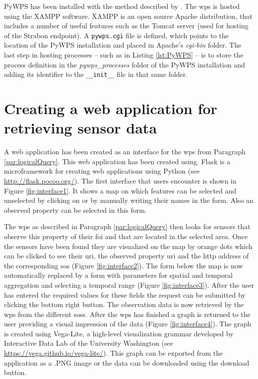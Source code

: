 PyWPS has been installed with the method described by \cite{wps:Deltares}. The \ac{wps} is hosted using the XAMPP software. XAMPP is an open source Apache distribution, that includes a number of useful features such as the Tomcat server (used for hosting of the Strabon endpoint). A \texttt{pywps.cgi} file is defined, which points to the location of the PyWPS installation and placed in Apache's \textit{cgi-bin} folder. The last step in hosting processes -- such as in Listing \ref{lst:PyWPS} -- is to store the process definition in the \textit{pywps\_processes} folder of the PyWPS installation and adding its identifier to the \texttt{\_\_init\_\_} file in that same folder.    

\section{Creating a web application for retrieving sensor data}
\label{par:webApp}
A web application has been created as an interface for the \ac{wps} from Paragraph \ref{par:logicalQuery}. This web application has been created using. Flask is a microframework for creating web applications using Python (see \url{http://flask.pocoo.org/}). The first interface that users encounter is shown in Figure \ref{fig:interface1}. It shows a map on which features can be selected and unselected by clicking on or by manually writing their names in the form. Also an observed property can be selected in this form.

The \ac{wps} as described in Paragraph \ref{par:logicalQuery} then looks for sensors that observe this property of their \ac{foi} and that are located in the selected area. Once the sensors have been found they are visualized on the map by orange dots which can be clicked to see their \ac{uri}, the observed property \ac{uri} and the \ac{http} address of the corresponding \ac{sos} (Figure \ref{fig:interface2}). The form below the map is now automatically replaced by a form with parameters for spatial and temporal aggregation and selecting a temporal range (Figure \ref{fig:interface3}). After the user has entered the required values for these fields the request can be submitted by clicking the bottom right button. The observation data is now retrieved by the \ac{wps} from the different \aclp{sos}. After the \ac{wps} has finished a graph is returned to the user providing a visual impression of the data (Figure \ref{fig:interface4}). The graph is created using Vega-Lite, a high-level visualization grammar developed by Interactive Data Lab of the University Washington (see \url{https://vega.github.io/vega-lite/}). This graph can be exported from the application as a .PNG image or the data can be downloaded using the download button.   

